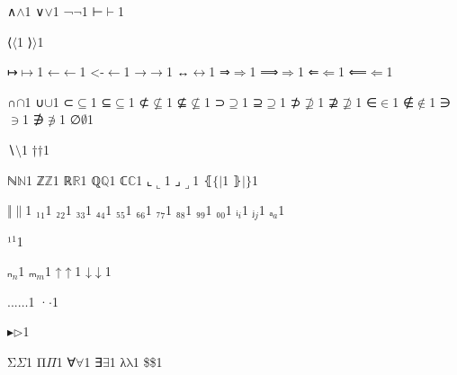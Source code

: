 {{∧}{{\ensuremath{\wedge}}}1
{∨}{{\ensuremath{\vee}}}1
{¬}{{\ensuremath{\neg}}}1
{⊢}{{\ensuremath{\vdash}}}1

{⟨}{{\ensuremath{\langle}}}1
{⟩}{{\ensuremath{\rangle}}}1

{↦}{{\ensuremath{\mapsto}}}1
{←}{{\ensuremath{\leftarrow}}}1
{<-}{{\ensuremath{\leftarrow}}}1
{→}{{\ensuremath{\rightarrow}}}1
{↔}{{\ensuremath{\leftrightarrow}}}1
{⇒}{{\ensuremath{\Rightarrow}}}1
{⟹}{{\ensuremath{\Longrightarrow}}}1
{⇐}{{\ensuremath{\Leftarrow}}}1
{⟸}{{\ensuremath{\Longleftarrow}}}1

{∩}{{\ensuremath{\cap}}}1
{∪}{{\ensuremath{\cup}}}1
{⊂}{{\ensuremath{\subseteq}}}1
{⊆}{{\ensuremath{\subseteq}}}1
{⊄}{{\ensuremath{\nsubseteq}}}1
{⊈}{{\ensuremath{\nsubseteq}}}1
{⊃}{{\ensuremath{\supseteq}}}1
{⊇}{{\ensuremath{\supseteq}}}1
{⊅}{{\ensuremath{\nsupseteq}}}1
{⊉}{{\ensuremath{\nsupseteq}}}1
{∈}{{\ensuremath{\in}}}1
{∉}{{\ensuremath{\notin}}}1
{∋}{{\ensuremath{\ni}}}1
{∌}{{\ensuremath{\notni}}}1
{∅}{{\ensuremath{\emptyset}}}1

{∖}{{\ensuremath{\setminus}}}1
{†}{{\ensuremath{\dag}}}1

{ℕ}{{\ensuremath{\mathbb{N}}}}1
{ℤ}{{\ensuremath{\mathbb{Z}}}}1
{ℝ}{{\ensuremath{\mathbb{R}}}}1
{ℚ}{{\ensuremath{\mathbb{Q}}}}1
{ℂ}{{\ensuremath{\mathbb{C}}}}1
{⌞}{{\ensuremath{\llcorner}}}1
{⌟}{{\ensuremath{\lrcorner}}}1
{⦃}{{\ensuremath{\{\!|}}}1
{⦄}{{\ensuremath{|\!\}}}}1

{‖}{{\ensuremath{\|}}}1
{₁}{{\ensuremath{_1}}}1
{₂}{{\ensuremath{_2}}}1
{₃}{{\ensuremath{_3}}}1
{₄}{{\ensuremath{_4}}}1
{₅}{{\ensuremath{_5}}}1
{₆}{{\ensuremath{_6}}}1
{₇}{{\ensuremath{_7}}}1
{₈}{{\ensuremath{_8}}}1
{₉}{{\ensuremath{_9}}}1
{₀}{{\ensuremath{_0}}}1
{ᵢ}{{\ensuremath{_i}}}1
{ⱼ}{{\ensuremath{_j}}}1
{ₐ}{{\ensuremath{_a}}}1

{¹}{{\ensuremath{^1}}}1

{ₙ}{{\ensuremath{_n}}}1
{ₘ}{{\ensuremath{_m}}}1
{↑}{{\ensuremath{\uparrow}}}1
{↓}{{\ensuremath{\downarrow}}}1

{...}{{\ensuremath{\ldots}}}1
{·}{{\ensuremath{\cdot}}}1

{▸}{{\ensuremath{\triangleright}}}1

{Σ}{{\color{symbolcolor}\ensuremath{\Sigma}}}1
{Π}{{\color{symbolcolor}\ensuremath{\Pi}}}1
{∀}{{\color{symbolcolor}\ensuremath{\forall}}}1
{∃}{{\color{symbolcolor}\ensuremath{\exists}}}1
{λ}{{\color{symbolcolor}\ensuremath{\mathrm{\lambda}}}}1
{\$}{{\color{symbolcolor}\$}}1

}
